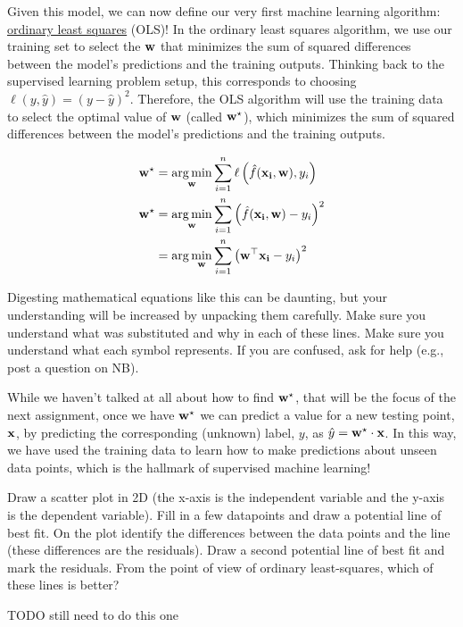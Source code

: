 \documentclass[assignment01_Solutions]{subfiles}
\begin{document}
Given this model, we can now define our very first machine learning algorithm: \href{https://en.wikipedia.org/wiki/Ordinary_least_squares}{ordinary least squares} (OLS)!  In the ordinary least squares algorithm, we use our training set to select the $\mathbf{w}$ that minimizes the sum of squared differences between the model's predictions and the training outputs.  Thinking back to the supervised learning problem setup, this corresponds to choosing $\ell(y, \hat{y}) = (y - \hat{y})^2$.
Therefore, the OLS algorithm will use the training data to select the optimal value of $\mathbf{w}$ (called $\mathbf{w}^\star$), which minimizes the sum of squared differences between the model's predictions and the training outputs.

\begin{align}
\mathbf{w}^\star &= \operatorname*{arg\,min}_{\mathbf{w}} \sum_{i=1}^n \ell \left ( \hat{f}(\mathbf{x_i}, \mathbf{w}) , y_i \right) \\
\mathbf{w}^\star &= \operatorname*{arg\,min}_{\mathbf{w}} \sum_{i=1}^n \left ( \hat{f}(\mathbf{x_i}, \mathbf{w}) - y_i \right)^2 \\
&= \arg\min_{\mathbf{w}} \sum_{i=1}^n \left ( \mathbf{w}^\top \mathbf{x_i} - y_i \right)^2
\end{align}

\begin{notice}
Digesting mathematical equations like this can be daunting, but your understanding will be increased by unpacking them carefully.  Make sure you understand what was substituted and why in each of these lines.  Make sure you understand what each symbol represents.  If you are confused, ask for help (e.g., post a question on NB).
\end{notice}

While we haven't talked at all about how to find $\mathbf{w}^\star$, that will be the focus of the next assignment, once we have $\mathbf{w}^\star$ we can predict a value for a new testing point, $\mathbf{x}$, by predicting the corresponding (unknown) label, $y$, as $\hat{y} = \mathbf{w^\star} \cdot \mathbf{x}$.  In this way, we have used the training data to learn how to make predictions about unseen data points, which is the hallmark of supervised machine learning!

\begin{exercise}
Draw a scatter plot in 2D (the x-axis is the independent variable and the y-axis is the dependent variable).  Fill in a few datapoints and draw a potential line of best fit.  On the plot identify the differences between the data points and the line (these differences are the residuals).  Draw a second potential line of best fit and mark the residuals.  From the point of view of ordinary least-squares, which of these lines is better?

\begin{boxedsolution}
TODO still need to do this one
\end{boxedsolution}
\end{exercise}
\end{document}
